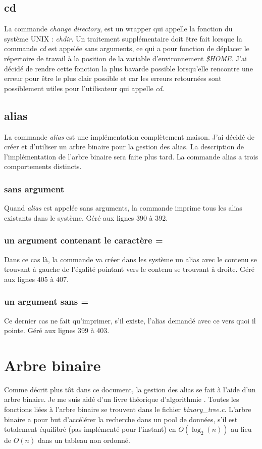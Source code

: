 \documentclass[a4paper,10pt]{article}
\begin{document}
\subsection{cd}
La commande \emph{change directory}, est un wrapper qui appelle la fonction du système UNIX : \emph{chdir}.
Un traitement supplémentaire doit être fait lorsque la commande \emph{cd} est appelée sans arguments, ce qui a pour fonction de déplacer le répertoire de travail à la position de la variable d'environnement \emph{\$HOME}.
J'ai décidé de rendre cette fonction la plus bavarde possible lorsqu'elle rencontre une erreur pour être le plus clair possible et car les erreurs retournées sont possiblement utiles pour l'utilisateur qui appelle \emph{cd}.
\subsection{alias}
La commande \emph{alias} est une implémentation complètement maison. J'ai décidé de créer et d'utiliser un arbre binaire pour la gestion des alias. La description de l'implémentation de l'arbre binaire sera faite plus tard.
La commande alias a trois comportements distincts.
\subsubsection{sans argument}
Quand \emph{alias} est appelée sans arguments, la commande imprime tous les alias existants dans le système. Géré aux lignes 390 à 392.
\subsubsection{un argument contenant le caractère =}
Dans ce cas là, la commande va créer dans les système un alias avec le contenu se trouvant à gauche de l'égalité pointant vers le contenu se trouvant à droite. Géré aux lignes 405 à 407.
\subsubsection{un argument sans =}
Ce dernier cas ne fait qu'imprimer, s'il existe, l'alias demandé avec ce vers quoi il pointe. Géré aux lignes 399 à 403.
\section{Arbre binaire}
Comme décrit plus tôt dans ce document, la gestion des alias se fait à l'aide d'un arbre binaire.
Je me suis aidé d'un livre théorique d'algorithmie \cite{ref}. Toutes les fonctions liées à l'arbre binaire se trouvent dans le fichier \emph{binary\_tree.c}. L'arbre binaire a pour but d'accélérer la recherche dans un pool de données, s'il est totalement équilibré (pas implémenté pour l'instant) en $O(\log_2(n))$ au lieu de $O(n)$ dans un tableau non ordonné.
\end{document}
